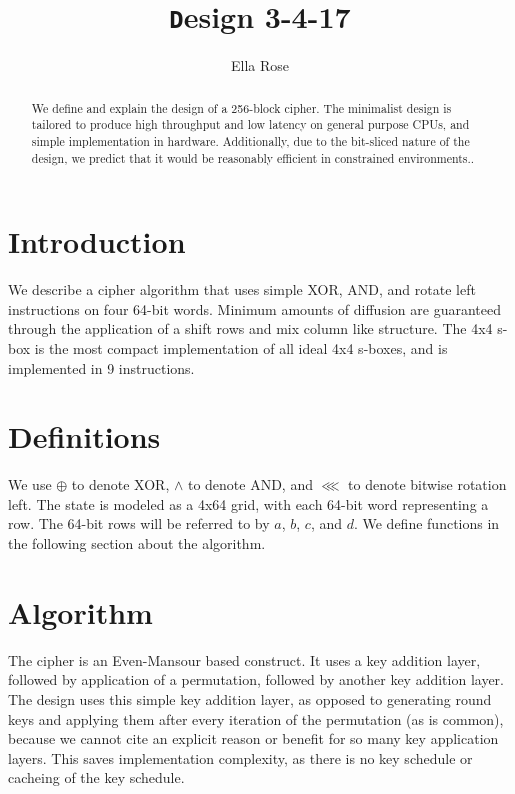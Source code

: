 \documentclass[preprint]{iacrtrans}
\author{Ella Rose\inst{1}}
\institute{Paso Robles, California \email{python_pride@protonmail.com}}
\title[\texttt Design 3-4-17]{\texttt Design 3-4-17}
\begin{document}
\maketitle


\begin{abstract}
  We define and explain the design of a 256-block cipher. The minimalist design is tailored to produce high throughput and low latency on general purpose CPUs, and simple implementation in hardware. Additionally, due to the bit-sliced nature of the design, we predict that it would be reasonably efficient in constrained environments..
\end{abstract}

\todototoc
\listoftodos

\section{Introduction}
We describe a cipher algorithm that uses simple XOR, AND, and rotate left instructions on four 64-bit words. Minimum amounts of diffusion are guaranteed through the application of a shift rows and mix column like structure. The 4x4 s-box is the most compact  implementation of all ideal 4x4 s-boxes, and is implemented in 9 instructions. %

\section{Definitions}
We use $\oplus$ to denote XOR, $\land$ to denote AND, and $\lll$ to denote bitwise rotation left. The state is modeled as a 4x64 grid, with each 64-bit word representing a row. The 64-bit rows will be referred to by $a$, $b$, $c$, and $d$. We define functions in the following section about the algorithm. 

\section{Algorithm}
The cipher is an Even-Mansour based construct. It uses a key addition layer, followed by application of a permutation, followed by another key addition layer. The design uses this simple key addition layer, as opposed to generating round keys and applying them after every iteration of the permutation (as is common), because we cannot cite an explicit reason or benefit for so many key application layers. This saves implementation complexity, as there is no key schedule or cacheing of the key schedule.
\end{document}
